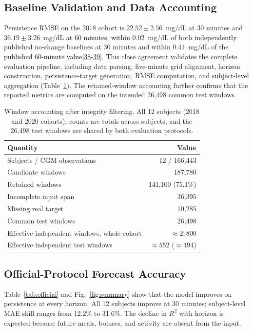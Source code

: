 \documentclass[journal]{IEEEtran}
\begin{document}
\subsection{Baseline Validation and Data Accounting}

Persistence RMSE on the 2018 cohort is $22.52 \pm 2.56$~mg/dL at 30 minutes and $36.19 \pm 3.26$~mg/dL at 60 minutes, within $0.02$~mg/dL of both independently published no-change baselines at 30 minutes and within $0.41$~mg/dL of the published 60-minute value[\hyperref[ref56label]{38}-\hyperref[ref57label]{39}]. This close agreement validates the complete evaluation pipeline, including data parsing, five-minute grid alignment, horizon construction, persistence-target generation, RMSE computation, and subject-level aggregation (Table~\ref{tab:windows}). The retained-window accounting further confirms that the reported metrics are computed on the intended 26,498 common test windows. 

\begin{table}[t]
\centering
\caption{Window accounting after integrity filtering. All 12 subjects (2018 and 2020 cohorts); counts are totals across subjects, and the 26,498 test windows are shared by both evaluation protocols.}
\label{tab:windows}
\footnotesize
\begin{tabular}{lr}
\toprule
Quantity & Value \\
\midrule
Subjects / CGM observations & 12 / 166,443 \\
Candidate windows & 187,780 \\
Retained windows & 141,100 (75.1\%) \\
Incomplete input span & 36,395 \\
Missing real target & 10,285 \\
Common test windows & 26,498 \\
Effective independent windows, whole cohort & $\approx 2{,}800$ \\
Effective independent test windows & $\approx 552$ ($\approx 494$) \\
\bottomrule
\end{tabular}
\end{table}

\subsection{Official-Protocol Forecast Accuracy}

Table~\ref{tab:official} and Fig.~\ref{fig:summary} show that the model improves on persistence at every horizon. All 12 subjects improve at 30 minutes; subject-level MAE skill ranges from 12.2\% to 31.6\%. The decline in $R^2$ with horizon is expected because future meals, boluses, and activity are absent from the input.
\end{document}
